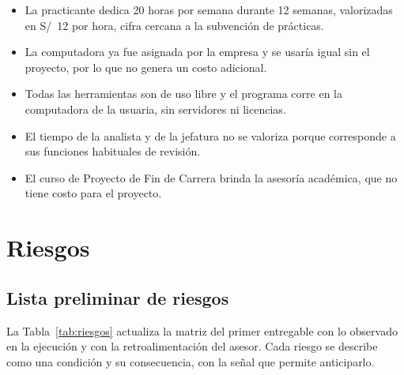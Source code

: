 \begin{itemize}
\item La practicante dedica 20 horas por semana durante 12 semanas, valorizadas en S/~12 por hora, cifra cercana a la subvención de prácticas.
\item La computadora ya fue asignada por la empresa y se usaría igual sin el proyecto, por lo que no genera un costo adicional.
\item Todas las herramientas son de uso libre y el programa corre en la computadora de la usuaria, sin servidores ni licencias.
\item El tiempo de la analista y de la jefatura no se valoriza porque corresponde a sus funciones habituales de revisión.
\item El curso de Proyecto de Fin de Carrera brinda la asesoría académica, que no tiene costo para el proyecto.
\end{itemize}

\section{Riesgos}
\label{sec:riesgos-final}

\subsection{Lista preliminar de riesgos}

La Tabla~\ref{tab:riesgos} actualiza la matriz del primer entregable con lo observado en la ejecución y con la retroalimentación del asesor. Cada riesgo se describe como una condición y su consecuencia, con la señal que permite anticiparlo.

